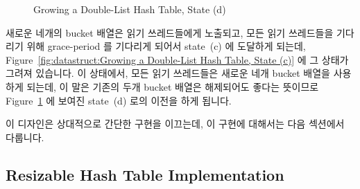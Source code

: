 \begin{figure}[tb]
\centering
{}
\caption{Growing a Double-List Hash Table, State (d)}
\label{fig:datastruct:Growing a Double-List Hash Table, State (d)}
\end{figure}

새로운 네개의 bucket 배열은 읽기 쓰레드들에게 노출되고, 모든 읽기 쓰레드들을
기다리기 위해 grace-period 를 기다리게 되어서 state~(c) 에 도달하게 되는데,
Figure~\ref{fig:datastruct:Growing a Double-List Hash Table, State (c)} 에 그
상태가 그려져 있습니다.
이 상태에서, 모든 읽기 쓰레드들은 새로운 네개 bucket 배열을 사용하게 되는데, 이
말은 기존의 두개 bucket 배열은 해제되어도 좋다는 뜻이므로
Figure~\ref{fig:datastruct:Growing a Double-List Hash Table, State (d)} 에
보여진 state~(d) 로의 이전을 하게 됩니다.

이 디자인은 상대적으로 간단한 구현을 이끄는데, 이 구현에 대해서는 다음 섹션에서
다룹니다.

\subsection{Resizable Hash Table Implementation}
\label{sec:datastruct:Resizable Hash Table Implementation}


